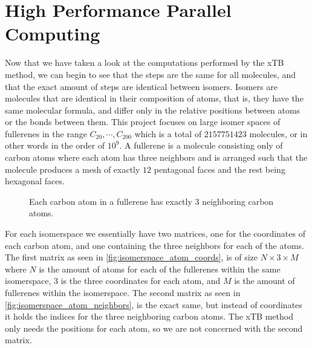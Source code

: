 
\section{High Performance Parallel Computing}

Now that we have taken a look at the computations performed by the xTB method, we can begin to see that the steps are the same for all molecules, and that the exact amount of steps are identical between isomers. Isomers are molecules that are identical in their composition of atoms, that is, they have the same molecular formula, and differ only in the relative positions between atoms or the bonds between them.
This project focuses on large isomer spaces of fullerenes in the range \(C_{20}, \cdots, C_{200} \) which is a total of $2157751423$ molecules, or in other words in the order of $10^9$. A fullerene is a molecule consisting only of carbon atoms where each atom has three neighbors and is arranged such that the molecule produces a mesh of exactly $12$ pentagonal faces and the rest being hexagonal faces.

\begin{figure}[H]
\centering
{}
\caption{Each carbon atom in a fullerene has exactly 3 neighboring carbon atoms.}
\label{fig:carbon-degree}
\end{figure}

For each isomerspace we essentially have two matrices, one for the coordinates of each carbon atom, and one containing the three neighbors for each of the atoms. The first matrix as seen in \autoref{fig:isomerspace_atom_coords}, is of size $N \times 3 \times M$ where $N$ is the amount of atoms for each of the fullerenes within the same isomerspace, $3$ is the three coordinates for each atom, and $M$ is the amount of fullerenes within the isomerspace. The second matrix as seen in \autoref{fig:isomerspace_atom_neighbors}, is the exact same, but instead of coordinates it holds the indices for the three neighboring carbon atoms. The xTB method only needs the positions for each atom, so we are not concerned with the second matrix.


